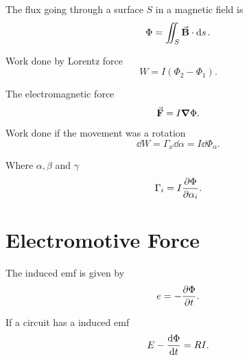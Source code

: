 The flux going through a surface $S$ in a magnetic field is
\[
	\Phi = \iint_S \va{B}\cdot\dd{s}
	.\]

Work done by Lorentz force
\[
	W = I(\Phi_2 - \Phi_1)
	.\]

The electromagnetic force
\[
	\va{F} = I \grad{\Phi}
	.\]

Work done if the movement was a rotation
\[
	\dd{W} = \Gamma_x\dd{\alpha} = I \dd{\Phi_\alpha}
	.\]

Where $\alpha, \beta$ and $\gamma$
\[
	\Gamma_i = I \pdv{\Phi}{\alpha_i}
	.\]

\section{Electromotive Force}
The induced emf is given by
\[
	e = -\pdv{\Phi}{t}
	.\]

If a circuit has a induced emf
\[
	E-\dv{\Phi}{t} = RI
	.\]


